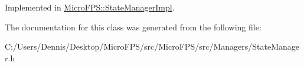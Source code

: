 Implemented in \hyperlink{class_micro_f_p_s_1_1_state_manager_impl_a36be818e3d8b561ef9372a1e043c05ed}{MicroFPS::StateManagerImpl}.



The documentation for this class was generated from the following file:\begin{DoxyCompactItemize}
\item 
C:/Users/Dennis/Desktop/MicroFPS/src/MicroFPS/src/Managers/StateManager.h\end{DoxyCompactItemize}
